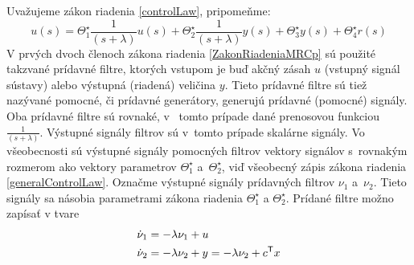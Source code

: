 \documentclass[a4paper, 10pt, ]{article}
\begin{document}
Uvažujeme zákon riadenia \eqref{controlLaw}, pripomeňme:
\begin{equation} \label{ZakonRiadeniaMRCp}
	u(s) = \Theta_1^\star \frac{1}{(s + \lambda)} u(s) + \Theta_2^\star \frac{1}{(s + \lambda)} y(s) + \Theta_3^\star y(s) + \Theta_4^\star r(s)
\end{equation}
V prvých dvoch členoch zákona riadenia \eqref{ZakonRiadeniaMRCp} sú použité takzvané prídavné filtre, ktorých vstupom je buď akčný zásah $u$ (vstupný signál sústavy) alebo výstupná (riadená) veličina $y$. Tieto prídavné filtre sú tiež nazývané pomocné, či prídavné generátory, generujú prídavné (pomocné) signály. Oba prídavné filtre sú rovnaké, v~ tomto prípade dané prenosovou funkciou $\frac{1}{(s + \lambda)}$. Výstupné signály filtrov sú v~tomto prípade skalárne signály. Vo všeobecnosti sú výstupné signály pomocných filtrov vektory signálov s~rovnakým rozmerom ako vektory parametrov $\Theta_1^\star$ a~$\Theta_2^\star$, viď všeobecný zápis zákona riadenia \eqref{generalControlLaw}. Označme výstupné signály prídavných filtrov $\nu_1$ a~$\nu_2$. Tieto signály sa násobia parametrami zákona riadenia ${{\Theta}_1^\star}$ a ${{\Theta}_2^\star}$. Prídané filtre možno zapísať v tvare
\begin{subequations}
	\begin{align}
		 \dot \nu_1 &= -\lambda \nu_1 + u \\
		 \dot \nu_2 &= -\lambda \nu_2 + y = -\lambda \nu_2 + c^{\mathsf{T}} x
	\end{align}
\end{subequations}
\end{document}
